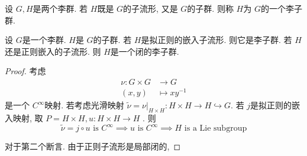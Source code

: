 \documentclass[../main.tex]{subfiles}
\begin{document}
\begin{definition}{}{}
  设 \(  G,H  \)是两个李群. 若 \(  H  \)既是 \(  G  \)的子流形, 又是 \(  G  \)的子群. 则称 \(  H  \)为 \(  G  \)的一个李子群.         
\end{definition}


\begin{theorem}{}{}
    设 \(  G  \)是一个李群. \(  H  \)是 \(  G  \)的子群. 若 \(  H  \)是拟正则的嵌入子流形. 则它是李子群. 若 \(  H  \)还是正则嵌入的子流形. 则 \(  H  \)是一个闭的李子群. 
\end{theorem}
\begin{proof}
 考虑   \[
    \begin{aligned}
    \nu : G\times G&\to G\\ 
     \left( x,y \right)&\mapsto xy^{-1}   
    \end{aligned}
    \]是一个 \(  C^{\infty}  \)映射.  
    若考虑光滑映射 \(\tilde{\nu} =  \left. \nu \right|_{H\times H}: H\times H\to H\hookrightarrow G  \).  若 \(  j  \)是拟正则的嵌入映射,  取 \(  P = H\times H,u: H\times H\to H  \) . 则 \[
    \tilde{\nu }= j\circ u \text{ is } C^{\infty} \implies  u \text{ is } C^{\infty} \implies  H  \text{ is a Lie subgroup} 
    \]

    对于第二个断言. 由于正则子流形是局部闭的,  
\end{proof}     
\end{document}
